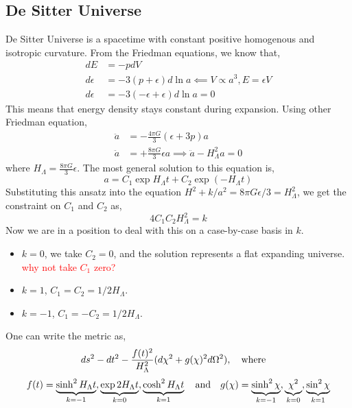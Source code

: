 \documentclass[a4paper,11pt]{article}
\begin{document}
\subsection{De Sitter Universe}
De Sitter Universe is a spacetime with constant positive homogenous and isotropic curvature. From the Friedman equations, we know that,
\begin{align*}
dE &= -pdV\\
d\epsilon &= -3 (p + \epsilon) d \ln a \impliedby V \propto a^3, E = \epsilon V\\
d\epsilon &= -3 (-\epsilon + \epsilon) d \ln a = 0
\end{align*}
This means that energy density stays constant during expansion. Using other Friedman equation,
\begin{align*}
\ddot{a} &= -\frac{4 \pi G}{3}(\epsilon + 3p)a\\
\ddot{a} &= +\frac{8 \pi G}{3}\epsilon a \implies \boxed{\ddot{a} - H_\Lambda^2 a = 0}
\end{align*}
where $H_\Lambda = \frac{8 \pi G}{3}\epsilon$. The most general solution to this equation is,
\begin{equation*}
a = C_1 \exp H_\Lambda t + C_2 \exp (- H_\Lambda t)
\end{equation*}
Substituting this ansatz into the equation $ H^2 + k/a^2 = 8\pi G \epsilon/3 = H_\Lambda^2 $, we get the constraint on $ C_1 $ and $ C_2 $ as,
\begin{equation*}
4C_1 C_2 H_\Lambda^2 = k
\end{equation*}
Now we are in a position to deal with this on a case-by-case basis in $ k $.
\begin{itemize}
	\item $  k= 0 $, we take $ C_2 = 0 $, and the solution represents a flat expanding universe. \textcolor{red}{why not take $ C_1 $ zero?}
	
	\item $ k=1 $, $ {C_1}={C_2}= 1/2 H_\Lambda $.
	\item $ k=-1 $, $ {C_1}=-{C_2}= 1/2 H_\Lambda $.	
\end{itemize}
One can write the metric as,
\begin{equation*}
	ds^2 - dt^2 -\dfrac{f(t)^2}{H_\Lambda^2}(d \chi^2 + g(\chi)^2 d\Omega^2), \qq{where}
\end{equation*}
\begin{equation*}
	f(t) = \underbrace{\sinh^2 H_\Lambda t}_{k=-1}, \underbrace{\exp 2 H_\Lambda t}_{k=0}, \underbrace{\cosh^2 H_\Lambda t}_{k=1} \qq{and} g(\chi) = \underbrace{\sinh^2 \chi }_{k=-1}, \underbrace{\chi^2 }_{k=0}, \underbrace{\sin^2 \chi}_{k=1}
\end{equation*}
\end{document}
